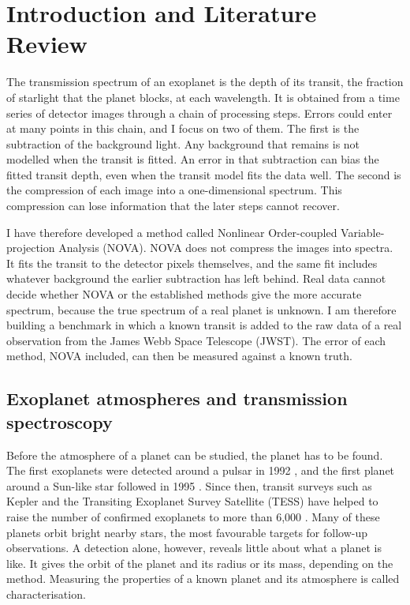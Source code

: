 \section{Introduction and Literature Review}
\label{sec:introduction}

The transmission spectrum of an exoplanet is the depth of its transit, the
fraction of starlight that the planet blocks, at each wavelength. It is
obtained from a time series of detector images through a chain of processing
steps. Errors could enter at many points in this chain, and I focus on two of them. The first is the subtraction of the background light. Any background that remains is not modelled when the transit is fitted. An error in that subtraction can bias the fitted transit depth, even when the transit model fits the data well. The second is the compression of each image into a one-dimensional spectrum. This compression can lose information that the later steps cannot recover.

I have therefore developed a method called Nonlinear Order-coupled Variable-projection Analysis (NOVA). NOVA does not
compress the images into spectra. It fits the transit to the detector pixels
themselves, and the same fit includes whatever background the earlier
subtraction has left behind. Real data cannot decide whether NOVA or the established methods give the more accurate spectrum, because the true spectrum of a real planet is unknown. I am therefore building a benchmark in
which a known transit is added to the raw data of a real observation from the
James Webb Space Telescope (JWST). The error of each method, NOVA included, can then be measured against a known truth.

\subsection{Exoplanet atmospheres and transmission spectroscopy}
\label{sec:atmospheres-transmission}

Before the atmosphere of a planet can be studied, the planet has to be found.
The first exoplanets were detected around a pulsar in 1992
\citep{WolszczanFrail1992}, and the first planet around a Sun-like star
followed in 1995 \citep{MayorQueloz1995}. Since then, transit surveys such as
Kepler and the Transiting Exoplanet Survey Satellite (TESS)
\citep{BoruckiEtAl2010,RickerEtAl2015} have helped to raise the number of
confirmed exoplanets to more than 6,000 \citep{NASAExoplanetArchive2026}.
Many of these planets orbit bright nearby stars, the most favourable targets
for follow-up observations. A detection alone, however, reveals little about
what a planet is like. It gives the orbit of the planet and its radius or its
mass, depending on the method. Measuring the properties of a
known planet and its atmosphere is called characterisation.

